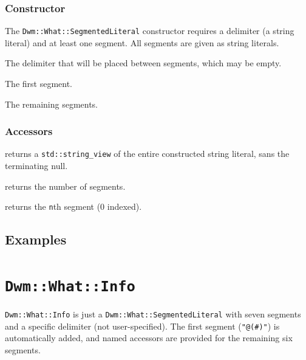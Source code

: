 \begin{minipage}{\linewidth}
\subsubsection{Constructor}
The \texttt{Dwm::What::SegmentedLiteral} constructor requires a
delimiter (a string literal) and at least one segment.  All segments
are given as string literals.

\begin{description}[noitemsep,align=left,leftmargin=*,labelsep=10pt,itemindent=-\leftmargin,style=nextline]
  \item[\texttt{delim}] The delimiter that will be placed between segments,
  which may be empty.
  \item[\texttt{firstSeg}] The first segment.
  \item[\texttt{moreSegs}] The remaining segments.
\end{description}
\end{minipage}

\subsubsection{Accessors}
\begin{description}[noitemsep,align=left,leftmargin=*,labelsep=10pt,itemindent=-\leftmargin,style=nextline]
  \item[\texttt{view()}] returns a \texttt{std::string\_view} of the entire
  constructed string literal, sans the terminating null.
  \item[\texttt{num\_segments()}] returns the number of segments.
  \item[\texttt{nth(std::size\_t n)}] returns the \texttt{n}th segment (0 indexed).
\end{description}

\subsection{Examples}

\begin{minipage}{\linewidth}

\end{minipage}



\pagebreak

\section{\texttt{Dwm::What::Info}}
\texttt{Dwm::What::Info} is just a \texttt{Dwm::What::SegmentedLiteral}
with seven segments and a specific delimiter (not user-specified).
The first segment (\texttt{"@(\#)"}) is automatically added, and named
accessors are provided for the remaining six segments.

